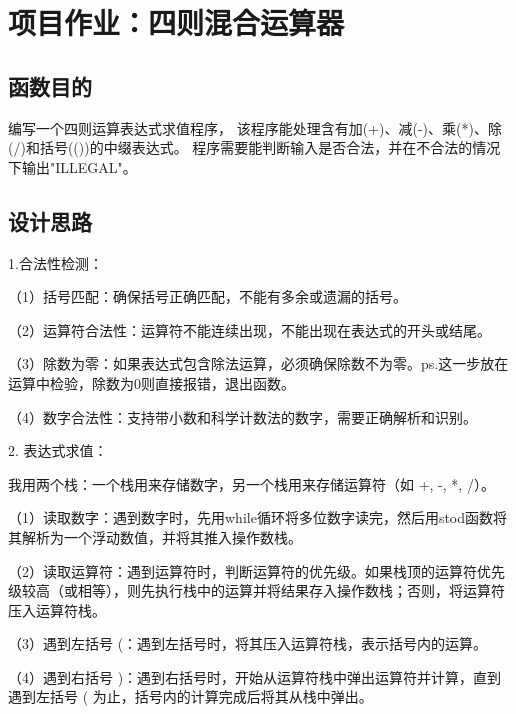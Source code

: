 \documentclass[UTF8]{ctexart}
\begin{document}
\pagestyle{fancy}
\fancyhead{}


\section{项目作业：四则混合运算器}  

\subsection{函数目的}
编写一个四则运算表达式求值程序，
该程序能处理含有加(+)、减(-)、乘(*)、除(/)和括号(())的中缀表达式。
程序需要能判断输入是否合法，并在不合法的情况下输出"ILLEGAL"。

\subsection{设计思路}
1.合法性检测：

（1）括号匹配：确保括号正确匹配，不能有多余或遗漏的括号。

（2）运算符合法性：运算符不能连续出现，不能出现在表达式的开头或结尾。

（3）除数为零：如果表达式包含除法运算，必须确保除数不为零。ps.这一步放在运算中检验，除数为0则直接报错，退出函数。

（4）数字合法性：支持带小数和科学计数法的数字，需要正确解析和识别。

2.  表达式求值：

我用两个栈：一个栈用来存储数字，另一个栈用来存储运算符（如 +, -, *, /）。

（1）读取数字：遇到数字时，先用while循环将多位数字读完，然后用stod函数将其解析为一个浮动数值，并将其推入操作数栈。

（2）读取运算符：遇到运算符时，判断运算符的优先级。如果栈顶的运算符优先级较高（或相等），则先执行栈中的运算并将结果存入操作数栈；否则，将运算符压入运算符栈。

（3）遇到左括号 (：遇到左括号时，将其压入运算符栈，表示括号内的运算。

（4）遇到右括号 )：遇到右括号时，开始从运算符栈中弹出运算符并计算，直到遇到左括号 ( 为止，括号内的计算完成后将其从栈中弹出。
\end{document}
